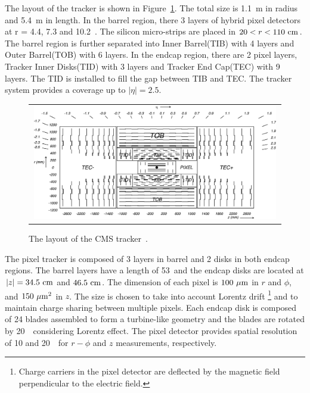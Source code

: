 The layout of the tracker is shown in Figure~\ref{fig:trackerlayout}. 
The total size is 1.1~m in radius and 5.4~m in length. 
In the barrel region, there 3 layers of hybrid pixel detectors
at r = 4.4, 7.3 and 10.2~\cm. The silicon micro-strips are 
placed in $20<r<110~\mathrm{cm}$. The barrel region is further separated 
into Inner Barrel(TIB) with 4 layers and Outer Barrel(TOB) with 6 layers. 
In the endcap region, there are 2 pixel layers, Tracker Inner Disks(TID)
with 3 layers and Tracker End Cap(TEC) with 9 layers. 
The TID is installed to fill the gap between TIB and TEC.
The tracker system provides a coverage up to $|\eta| = 2.5$.
%
\begin{figure}[htp] 
\centering 
\begin{tabular}{c} 
\includegraphics[width=0.99\textwidth]{figures/trackerlayout.jpeg} 
\end{tabular} 
\caption{The layout of the CMS tracker~\cite{Anghel2009277}.} 
\label{fig:trackerlayout} 
\end{figure} 

The pixel tracker is composed of 3 layers in barrel and 2 disks in both 
endcap regions. The barrel layers have a length of 53~\cm and the 
endcap disks are located at $|z|=34.5~\mathrm{cm}$ and $46.5~\mathrm{cm}$. 
The dimension of each pixel is $100~\mu\mathrm{m}$ in $r$ and $\phi$, and $150~\mu\mathrm{m}^2$ in $z$.  
The size is chosen to take into account Lorentz drift  
\footnote{
Charge carriers in the pixel detector are deflected by the magnetic field perpendicular 
to the electric field. }
and to maintain charge sharing between multiple pixels. 
Each endcap disk is composed of 24 blades assembled to form 
a turbine-like geometry and the blades are rotated by 20~\dg\
considering Lorentz effect. The pixel detector provides 
spatial resolution of 10 and 20~\um\ for $r-\phi$ and $z$ measurements, 
respectively.

